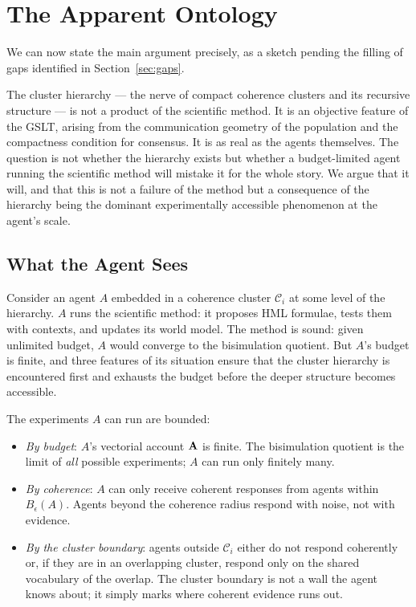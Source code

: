 \chapter{The Apparent Ontology}
\label{sec:false-ontology}

We can now state the main argument precisely, as a sketch pending
the filling of gaps identified in Section~\ref{sec:gaps}.

The cluster hierarchy --- the nerve of compact coherence clusters
and its recursive structure --- is not a product of the scientific
method.
It is an objective feature of the GSLT, arising from the
communication geometry of the population and the compactness
condition for consensus.
It is as real as the agents themselves.
The question is not whether the hierarchy exists but whether a
budget-limited agent running the scientific method will mistake
it for the whole story.
We argue that it will, and that this is not a failure of the
method but a consequence of the hierarchy being the dominant
experimentally accessible phenomenon at the agent's scale.

\section{What the Agent Sees}

Consider an agent $A$ embedded in a coherence cluster $\mathcal{C}_i$
at some level of the hierarchy.
$A$ runs the scientific method: it proposes HML formulae, tests them
with contexts, and updates its world model.
The method is sound: given unlimited budget, $A$ would converge
to the bisimulation quotient.
But $A$'s budget is finite, and three features of its situation
ensure that the cluster hierarchy is encountered first and
exhausts the budget before the deeper structure becomes accessible.

The experiments $A$ can run are bounded:
\begin{itemize}[itemsep=2pt]
  \item \emph{By budget}: $A$'s vectorial account $\mathbf{A}$ is finite.
        The bisimulation quotient is the limit of \emph{all} possible
        experiments; $A$ can run only finitely many.
  \item \emph{By coherence}: $A$ can only receive coherent responses
        from agents within $B_\epsilon(A)$.
        Agents beyond the coherence radius respond with noise, not
        with evidence.
  \item \emph{By the cluster boundary}: agents outside $\mathcal{C}_i$
        either do not respond coherently or, if they are in an
        overlapping cluster, respond only on the shared vocabulary
        of the overlap.
        The cluster boundary is not a wall the agent knows about;
        it simply marks where coherent evidence runs out.
\end{itemize}

